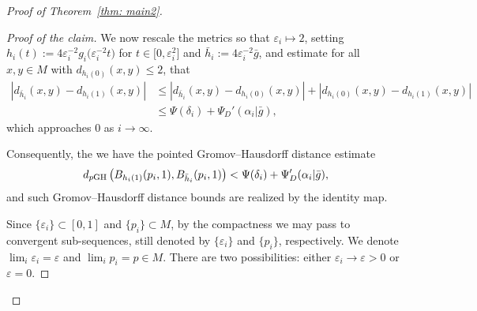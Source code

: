 \documentclass[10pt,a4paper]{amsart}
\numberwithin{equation}{section}
\begin{document}
\begin{proof}[Proof of Theorem~\ref{thm: main2}]
\begin{proof}[Proof of the claim]
We now rescale the metrics so that $\varepsilon_i\mapsto 2$, setting
$h_i(t):=4\varepsilon_i^{-2}g_i\big(\varepsilon_i^{-2} t\big)$ for $t\in
\big[0,\varepsilon_i^2\big]$ and $\bar{h}_i:=4\varepsilon_i^{-2}\bar{g}$, and
estimate for all $x,y\in M$ with $d_{h_i(0)}(x,y)\le 2$, that
\begin{align*}
 |d_{\bar{h}_i}(x,y)-d_{h_i(1)}(x,y) | & \le
 |d_{\bar{h}_i}(x,y)-d_{h_i(0)}(x,y) |
+ |d_{h_i(0)}(x,y)-d_{h_i(1)}(x,y) |\\
& \le \Psi(\delta_i)+\Psi_D'(\alpha_i|\bar{g}),
\end{align*}
which approaches $0$ as $i\to \infty$.

Consequently, the we have the pointed Gromov--Hausdorff distance estimate
\begin{align}\label{eqn: GH}
d_{p{\rm GH}}\left(B_{h_i(1)}(p_i, 1), B_{\bar{h}_i}(p_i, 1)
\right) < \Psi(\delta_i)+\Psi_D'(\alpha_i|\bar{g}),
\end{align}
and such Gromov--Hausdorff distance bounds are realized by the identity map.

Since $\{\varepsilon_i\}\subset [0,1]$ and $\{p_i\}\subset M$, by the
compactness we may pass to convergent sub-sequences, still denoted by
$\{\varepsilon_i\}$ and $\{p_i\}$, respectively. We denote
$\lim_i\varepsilon_i=\varepsilon$ and \mbox{$\lim_ip_i=p\!\in\! M$}. There are two
possibilities: either $\varepsilon_i\to\varepsilon>0$ or $\varepsilon=0$.


\end{proof}
\end{proof}
\end{document}
